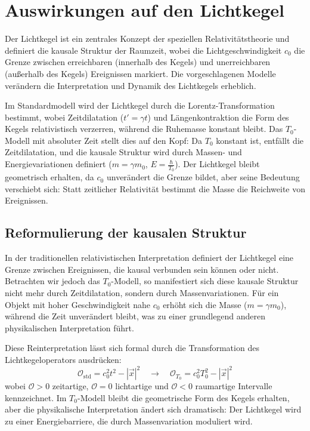 \documentclass[a4paper,12pt]{article}
\begin{document}
	\section{Auswirkungen auf den Lichtkegel}
	Der Lichtkegel ist ein zentrales Konzept der speziellen Relativitätstheorie und definiert die kausale Struktur der Raumzeit, wobei die Lichtgeschwindigkeit \( c_0 \) die Grenze zwischen erreichbaren (innerhalb des Kegels) und unerreichbaren (außerhalb des Kegels) Ereignissen markiert. Die vorgeschlagenen Modelle verändern die Interpretation und Dynamik des Lichtkegels erheblich.
	
	Im Standardmodell wird der Lichtkegel durch die Lorentz-Transformation bestimmt, wobei Zeitdilatation (\( t' = \gamma t \)) und Längenkontraktion die Form des Kegels relativistisch verzerren, während die Ruhemasse konstant bleibt. Das \( T_0 \)-Modell mit absoluter Zeit stellt dies auf den Kopf: Da \( T_0 \) konstant ist, entfällt die Zeitdilatation, und die kausale Struktur wird durch Massen- und Energievariationen definiert (\( m = \gamma m_0 \), \( E = \frac{\hbar}{T_0} \)). Der Lichtkegel bleibt geometrisch erhalten, da \( c_0 \) unverändert die Grenze bildet, aber seine Bedeutung verschiebt sich: Statt zeitlicher Relativität bestimmt die Masse die Reichweite von Ereignissen.
	
	\subsection{Reformulierung der kausalen Struktur}
	In der traditionellen relativistischen Interpretation definiert der Lichtkegel eine Grenze zwischen Ereignissen, die kausal verbunden sein können oder nicht. Betrachten wir jedoch das \( T_0 \)-Modell, so manifestiert sich diese kausale Struktur nicht mehr durch Zeitdilatation, sondern durch Massenvariationen. Für ein Objekt mit hoher Geschwindigkeit nahe \( c_0 \) erhöht sich die Masse (\( m = \gamma m_0 \)), während die Zeit unverändert bleibt, was zu einer grundlegend anderen physikalischen Interpretation führt.
	
	Diese Reinterpretation lässt sich formal durch die Transformation des Lichtkegeloperators ausdrücken:
	\begin{equation}
		\mathcal{O}_{\text{std}} = c_0^2 t^2 - |\vec{x}|^2 \quad \rightarrow \quad \mathcal{O}_{T_0} = c_0^2 T_0^2 - |\vec{x}|^2
	\end{equation}
	wobei \( \mathcal{O} > 0 \) zeitartige, \( \mathcal{O} = 0 \) lichtartige und \( \mathcal{O} < 0 \) raumartige Intervalle kennzeichnet. Im \( T_0 \)-Modell bleibt die geometrische Form des Kegels erhalten, aber die physikalische Interpretation ändert sich dramatisch: Der Lichtkegel wird zu einer Energiebarriere, die durch Massenvariation moduliert wird.
	
\end{document}
